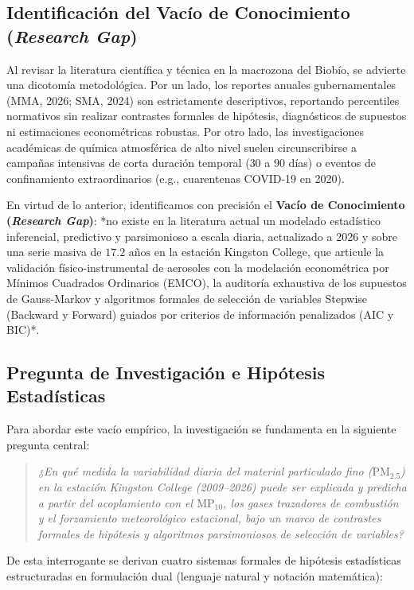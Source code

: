 \documentclass[10pt,twocolumn,a4paper]{article}
\begin{document}
\subsection{Identificación del Vacío de Conocimiento (\textit{Research Gap})}
Al revisar la literatura científica y técnica en la macrozona del Biobío, se advierte una dicotomía metodológica. Por un lado, los reportes anuales gubernamentales (MMA, 2026; SMA, 2024) son estrictamente descriptivos, reportando percentiles normativos sin realizar contrastes formales de hipótesis, diagnósticos de supuestos ni estimaciones econométricas robustas. Por otro lado, las investigaciones académicas de química atmosférica de alto nivel suelen circunscribirse a campañas intensivas de corta duración temporal ($30$ a $90$ días) o eventos de confinamiento extraordinarios (e.g., cuarentenas COVID-19 en 2020).

En virtud de lo anterior, identificamos con precisión el \textbf{Vacío de Conocimiento (\textit{Research Gap})}: *no existe en la literatura actual un modelado estadístico inferencial, predictivo y parsimonioso a escala diaria, actualizado a 2026 y sobre una serie masiva de $17.2\text{ años}$ en la estación Kingston College, que articule la validación físico-instrumental de aerosoles con la modelación econométrica por Mínimos Cuadrados Ordinarios (EMCO), la auditoría exhaustiva de los supuestos de Gauss-Markov y algoritmos formales de selección de variables Stepwise (Backward y Forward) guiados por criterios de información penalizados (AIC y BIC)*.

\subsection{Pregunta de Investigación e Hipótesis Estadísticas}
Para abordar este vacío empírico, la investigación se fundamenta en la siguiente pregunta central:

\begin{quote}
\textit{¿En qué medida la variabilidad diaria del material particulado fino ($\text{PM}_{2.5}$) en la estación Kingston College (2009--2026) puede ser explicada y predicha a partir del acoplamiento con el $\text{MP}_{10}$, los gases trazadores de combustión y el forzamiento meteorológico estacional, bajo un marco de contrastes formales de hipótesis y algoritmos parsimoniosos de selección de variables?}
\end{quote}

De esta interrogante se derivan cuatro sistemas formales de hipótesis estadísticas estructuradas en formulación dual (lenguaje natural y notación matemática):
\end{document}
